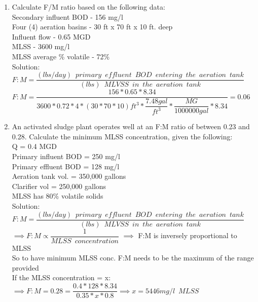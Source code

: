 \begin{enumerate}
\item Calculate F/M ratio based on the following data:\\
Secondary influent BOD - 156 mg/l\\
Four (4) aeration basins - 30 ft x 70 ft x 10 ft. deep\\
Influent flow - 0.65 MGD\\
MLSS - 3600 mg/l\\
MLSS average \% volatile - 72\%\\
Solution:\\
\vspace{0.3cm}
$F:M=\dfrac{(lbs/day) \enspace primary \enspace effluent  \enspace BOD \enspace entering \enspace the  \enspace aeration \enspace tank}{(lbs) \enspace MLVSS \enspace in \enspace the  \enspace aeration \enspace tank}$\\
\vspace{0.3cm}
$F:M=\dfrac{156*0.65*8.34}{3600*0.72*4*(30*70*10)ft^3* \dfrac{7.48gal}{ft^3}*\dfrac{MG}{1000000gal}*8.34}=\boxed{0.06}$\\
\pagebreak
\item An activated sludge plant operates well at an F:M ratio of between 0.23 and 0.28.  Calculate the minimum MLSS concentration, given the following:\\
Q = 0.4 MGD\\
Primary influent BOD = 250 mg/l\\
Primary effluent BOD = 128 mg/l\\
Aeration tank vol. = 350,000 gallons\\
Clarifier vol = 250,000 gallons\\
MLSS has 80\% volatile solids\\
Solution:\\
\vspace{0.3cm}
$F:M=\dfrac{(lbs/day) \enspace primary \enspace effluent  \enspace BOD \enspace entering \enspace the  \enspace aeration \enspace tank}{(lbs) \enspace MLVSS \enspace in \enspace the  \enspace aeration \enspace tank}$\\
\vspace{0.3cm}
$\implies F:M \propto \dfrac{1}{MLSS \enspace concentration}$  $\implies$ F:M is inversely proportional to MLSS\\
\vspace{0.3cm}
So to have minimum MLSS conc. F:M needs to be the maximum of the range provided\\
\vspace{0.3cm}
If the MLSS concentration = x:
$ \implies F:M=0.28=\dfrac{0.4*128*8.34}{0.35*x*0.8}\implies x = \boxed{5446 mg/l \enspace MLSS}$






\end{enumerate}
